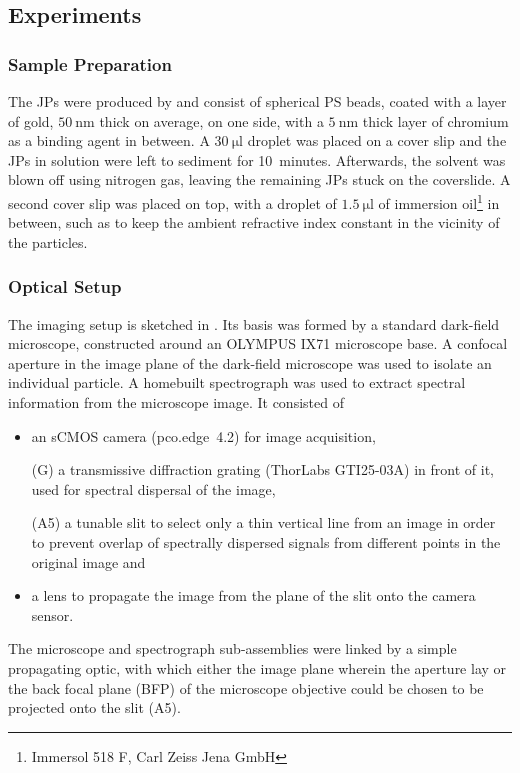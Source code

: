 \documentclass[10pt]{article}
\newcommand{\reffig}[2]{\mbox{\sffamily{Figure \ref{#1}#2}}}
\begin{document}
\subsection*{Experiments}

\subsubsection*{Sample Preparation}

The JPs were produced by  and consist of spherical PS beads, coated with a layer of gold, $\SI{50}{\nano\meter}$ thick on average, on one side, with a $\SI{5}{\nano\meter}$ thick layer of chromium as a binding agent in between. 
A $\SI{30}{\micro\litre}$ droplet was placed on a cover slip and the JPs in solution were left to sediment for \mbox{10 minutes}. 
Afterwards, the solvent was blown off using nitrogen gas, leaving the remaining JPs stuck on the coverslide. 
A second cover slip was placed on top, with a droplet of $\SI{1.5}{\micro\litre}$ of immersion oil\footnote{\sffamily Immersol 518 F, Carl Zeiss Jena GmbH} in between, such as to keep the ambient refractive index constant in the vicinity of the particles.   

\subsubsection*{Optical Setup}

The imaging setup is sketched in \reffig{fig:setup}{C}. 
Its basis was formed by a standard dark-field microscope, constructed around an {\sffamily OLYMPUS IX71} microscope base. 
A confocal aperture in the image plane of the dark-field microscope was used to isolate an individual particle. 
A homebuilt spectrograph was used to extract spectral information from the microscope image. 
It consisted of 
\begin{itemize}
    \item an sCMOS camera \mbox{\sffamily(pco.edge 4.2)} for image acquisition, 
    \item[{\sffamily(G)}] a transmissive diffraction grating {\sffamily(ThorLabs GTI25-03A)} in front of it, used for spectral dispersal of the image,
    \item[{\sffamily(A5)}] a tunable slit to select only a thin vertical line from an image in order to prevent overlap of spectrally dispersed signals from different points in the original image and
    \item a lens to propagate the image from the plane of the slit onto the camera sensor.  
\end{itemize}
The microscope and spectrograph sub-assemblies were linked by a simple propagating optic, with which either the image plane wherein the aperture lay or the back focal plane (BFP) of the microscope objective could be chosen to be projected onto the slit {\sffamily(A5)}. 
\end{document}
